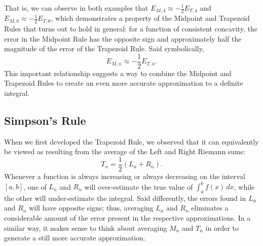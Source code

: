 That is, we can observe in both examples that $E_{M,4} \approx -\frac{1}{2} E_{T,4}$ and $E_{M,8} \approx -\frac{1}{2}E_{T,8}$, which demonstrates a property of the Midpoint and Trapezoid Rules that turns out to hold in general: for a function of consistent concavity, the error in the Midpoint Rule has the opposite sign and approximately half the magnitude of the error of the Trapezoid Rule.  Said symbolically,
$$E_{M,n} \approx -\frac{1}{2} E_{T,n}.$$
This important relationship suggests a way to combine the Midpoint and Trapezoid Rules to create an even more accurate approximation to a definite integral.

\subsection*{Simpson's Rule} 

When we first developed the Trapezoid Rule, we observed that it can equivalently be viewed as resulting from the average of the Left and Right Riemann sums:
$$T_n = \frac{1}{2}(L_n + R_n).$$
Whenever a function is always increasing or always decreasing on the interval $[a,b]$, one of $L_n$ and $R_n$ will over-estimate the true value of $\int_a^b f(x) \, dx$, while the other will under-estimate the integral.  Said differently, the errors found in $L_n$ and $R_n$ will have opposite signs; thus, averaging $L_n$ and $R_n$ eliminates a considerable amount of the error present in the respective approximations.  In a similar way, it makes sense to think about averaging $M_n$ and $T_n$ in order to generate a still more accurate approximation.

